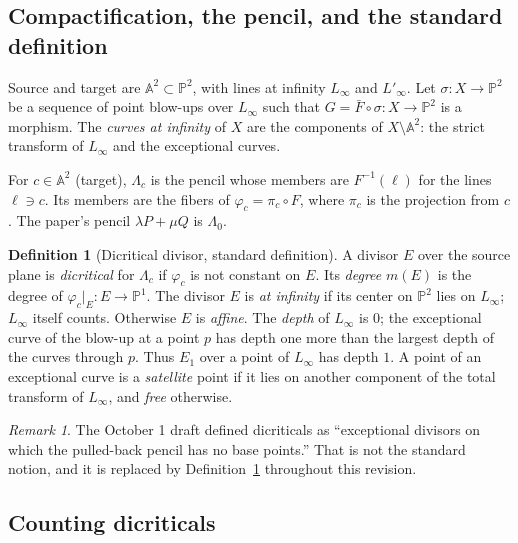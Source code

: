 \documentclass[a4paper,11pt]{article}
\theoremstyle{plain}
\theoremstyle{definition}
\newtheorem{definition}[theorem]{Definition}
\theoremstyle{remark}
\newtheorem{remark}[theorem]{Remark}
\begin{document}
\subsection{Compactification, the pencil, and the standard definition}

Source and target are $\mathbb{A}^2 \subset \mathbb{P}^2$, with lines at infinity $L_\infty$
and $L'_\infty$. Let $\sigma \colon X \to \mathbb{P}^2$ be a sequence of point blow-ups over
$L_\infty$ such that $G = \bar{F} \circ \sigma \colon X \to \mathbb{P}^2$ is a morphism. The
\emph{curves at infinity} of $X$ are the components of $X \setminus \mathbb{A}^2$: the strict
transform of $L_\infty$ and the exceptional curves.

For $c \in \mathbb{A}^2$ (target), $\Lambda_c$ is the pencil whose members are $F^{-1}(\ell)$
for the lines $\ell \ni c$. Its members are the fibers of
$\varphi_c = \pi_c \circ F$, where $\pi_c$ is the projection from $c$. The paper's pencil
$\lambda P + \mu Q$ is $\Lambda_0$.

\begin{definition}[Dicritical divisor, standard definition]\label{td:def:dicritical}
A divisor $E$ over the source plane is \emph{dicritical} for $\Lambda_c$ if $\varphi_c$ is
not constant on $E$. Its \emph{degree} $m(E)$ is the degree of
$\varphi_c|_E \colon E \to \mathbb{P}^1$. The divisor $E$ is \emph{at infinity} if its center
on $\mathbb{P}^2$ lies on $L_\infty$; $L_\infty$ itself counts. Otherwise $E$ is
\emph{affine}. The \emph{depth} of $L_\infty$ is $0$; the exceptional curve of the blow-up at
a point $p$ has depth one more than the largest depth of the curves through $p$. Thus $E_1$
over a point of $L_\infty$ has depth $1$. A point of an exceptional curve is a
\emph{satellite} point if it lies on another component of the total transform of $L_\infty$,
and \emph{free} otherwise.
\end{definition}

\begin{remark}
The October 1 draft defined dicriticals as ``exceptional divisors on which the pulled-back
pencil has no base points.'' That is not the standard notion, and it is replaced by
Definition~\ref{td:def:dicritical} throughout this revision.
\end{remark}

\subsection{Counting dicriticals}
\end{document}
